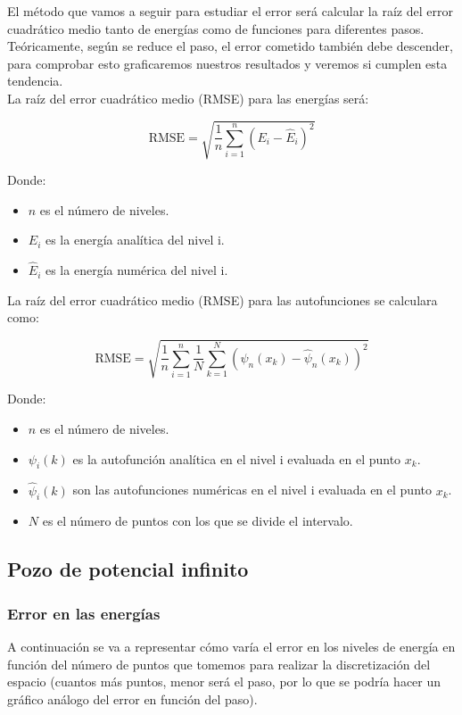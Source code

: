 \documentclass[12pt]{article}
\begin{document}
El método que vamos a seguir para estudiar el error será calcular la raíz del error cuadrático medio tanto de energías como de funciones para diferentes pasos. Teóricamente, según se reduce el paso, el error cometido también debe descender, para comprobar esto graficaremos nuestros resultados y veremos si cumplen esta tendencia. \\

La raíz del error cuadrático medio (RMSE) para las energías será:

\[
\text{RMSE} = \sqrt{\frac{1}{n} \sum_{i=1}^{n} (E_i - \hat{E}_i)^2}
\]

Donde:
\begin{itemize}
    \item \( n \) es el número de niveles.
    \item \( E_i \) es la energía analítica del nivel i.
    \item \( \hat{E}_i \) es la energía numérica del nivel i.
\end{itemize}

La raíz del error cuadrático medio (RMSE) para las autofunciones se calculara como:

\[
\text{RMSE} =\sqrt{\frac{1}{n}\sum_{i=1}^{n}\frac{1}{N} \sum_{k=1}^{N} (\psi_n(x_k) - \hat{\psi}_n(x_k))^2}
\]

Donde:
\begin{itemize}
    \item \( n \) es el número de niveles.
    \item \( \psi_i(k) \) es la autofunción analítica en el nivel i evaluada en el punto $x_k$.
    \item \( \hat{\psi}_i(k) \) son las autofunciones numéricas en el nivel i evaluada en el punto $x_k$.
    \item \( N \) es el número de puntos con los que se divide el intervalo.
\end{itemize}


    \subsection{Pozo de potencial infinito}

    \subsubsection{Error en las energías}

    A continuación se va a representar cómo varía el error en los niveles de energía en función del número de puntos que tomemos para realizar la discretización del espacio (cuantos más puntos, menor será el paso, por lo que se podría hacer un gráfico análogo del error en función del paso).\\
    
\end{document}
